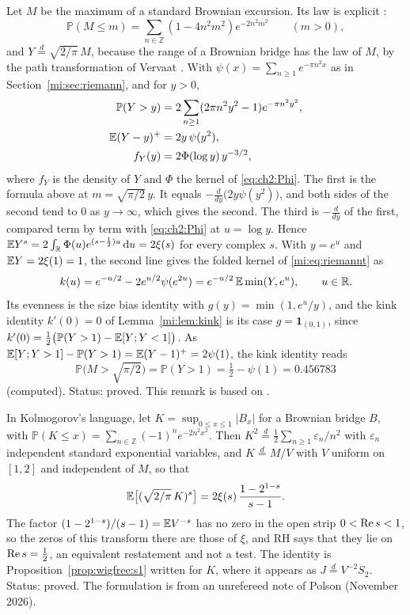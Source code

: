 \begin{remark}\label{ht:rem:chung}
\begin{resultpar}\label{ht:res:chung}Let $M$ be the maximum of a standard Brownian excursion. Its law is explicit \cite{Chung76,Kennedy76}:
\[
\mathbb P(M\le m)=\sum_{n\in\mathbb Z}(1-4n^2m^2)e^{-2n^2m^2}\qquad(m>0),
\]
and $Y\overset{d}{=}\sqrt{2/\pi}\,M$, because the range of a Brownian bridge has the law of $M$, by the path transformation of Vervaat \cite{Vervaat79}. With $\psi(x)=\sum_{n\ge1}e^{-\pi n^2x}$ as in Section~\ref{mi:sec:riemann}, and for $y>0$,
\begin{align*}
\mathbb P(Y>y)&=2\sum_{n\ge1}(2\pi n^2y^2-1)e^{-\pi n^2y^2},\\
\mathbb{E}(Y-y)^+&=2y\,\psi(y^2),\\
f_Y(y)&=2\Phi(\log y)\,y^{-3/2},
\end{align*}
where $f_Y$ is the density of $Y$ and $\Phi$ the kernel of \eqref{eq:ch2:Phi}. The first is the formula above at $m=\sqrt{\pi/2}\,y$. It equals $-\frac{d}{dy}\big(2y\psi(y^2)\big)$, and both sides of the second tend to $0$ as $y\to\infty$, which gives the second. The third is $-\frac{d}{dy}$ of the first, compared term by term with \eqref{eq:ch2:Phi} at $u=\log y$. Hence $\mathbb{E} Y^s=2\int_{\mathbb{R}}\Phi(u)e^{(s-\frac12)u}\,\mathrm du=2\xi(s)$ for every complex $s$. With $y=e^u$ and $\mathbb{E} Y=2\xi(1)=1$, the second line gives the folded kernel of \eqref{mi:eq:riemannt} as
\[
k(u)=e^{-u/2}-2e^{u/2}\psi(e^{2u})=e^{-u/2}\,\mathbb{E}\min(Y,e^u),\qquad u\in\mathbb{R}.
\]
Its evenness is the size bias identity with $g(y)=\min(1,e^u/y)$, and the kink identity $k'(0)=0$ of Lemma~\ref{mi:lem:kink} is its case $g=\mathbf 1_{(0,1)}$, since $k'(0)=\frac12\big(\mathbb P(Y>1)-\mathbb{E}[Y;Y<1]\big)$. As $\mathbb{E}[Y;Y>1]-\mathbb P(Y>1)=\mathbb{E}(Y-1)^+=2\psi(1)$, the kink identity reads
\[
\mathbb P\big(M>\sqrt{\pi/2}\big)=\mathbb P(Y>1)=\tfrac12-\psi(1)=0.456783
\]
(computed). Status: proved. This remark is based on \cite{P26excursion}.\end{resultpar}

\begin{resultpar}In Kolmogorov's language, let $K=\sup_{0\le x\le1}|B_x|$ for a Brownian bridge $B$, with $\mathbb P(K\le x)=\sum_{n\in\mathbb Z}(-1)^ne^{-2n^2x^2}$. Then $K^2\overset d=\frac12\sum_{n\ge1}\varepsilon_n/n^2$ with $\varepsilon_n$ independent standard exponential variables, and $K\overset d=M/V$ with $V$ uniform on $[1,2]$ and independent of $M$, so that
\[
\mathbb{E}\big[(\sqrt{2/\pi}\,K)^s\big]=2\xi(s)\,\frac{1-2^{1-s}}{s-1}.
\]
The factor $(1-2^{1-s})/(s-1)=\mathbb{E} V^{-s}$ has no zero in the open strip $0<\operatorname{Re} s<1$, so the zeros of this transform there are those of $\xi$, and RH says that they lie on $\operatorname{Re} s=\frac12$, an equivalent restatement and not a test. The identity is Proposition~\ref{prop:wigfree:s1} written for $K$, where it appears as $J\overset d=V^{-2}S_2$. Status: proved. The formulation is from an unrefereed note of Polson (November 2026).\end{resultpar}
\end{remark}

